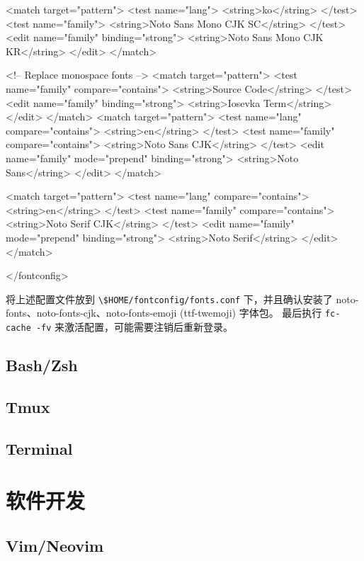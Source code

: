 \begin{lstcode}
  <match target="pattern">
    <test name="lang">
      <string>ko</string>
    </test>
    <test name="family">
      <string>Noto Sans Mono CJK SC</string>
    </test>
    <edit name="family" binding="strong">
      <string>Noto Sans Mono CJK KR</string>
    </edit>
  </match>
  
  <!-- Replace monospace fonts -->
  <match target="pattern">
    <test name="family" compare="contains">
      <string>Source Code</string>
    </test>
    <edit name="family" binding="strong">
      <string>Iosevka Term</string>
    </edit>
  </match>
    <match target="pattern">
    <test name="lang" compare="contains">
      <string>en</string>
    </test>
    <test name="family" compare="contains">
      <string>Noto Sans CJK</string>
    </test>
    <edit name="family" mode="prepend" binding="strong">
      <string>Noto Sans</string>
    </edit>
  </match>

  <match target="pattern">
    <test name="lang" compare="contains">
      <string>en</string>
    </test>
    <test name="family" compare="contains">
      <string>Noto Serif CJK</string>
    </test>
    <edit name="family" mode="prepend" binding="strong">
      <string>Noto Serif</string>
    </edit>
  </match>

</fontconfig>
\end{lstcode}

将上述配置文件放到 \lstinline{\$HOME/fontconfig/fonts.conf} 下，并且确认安装了 noto-fonts、noto-fonts-cjk、noto-fonts-emoji (ttf-twemoji) 字体包。
最后执行 \lstinline{fc-cache -fv} 来激活配置，可能需要注销后重新登录。

\subsection{Bash/Zsh}

\subsection{Tmux}

\subsection{Terminal}

\section{软件开发}
\subsection{Vim/Neovim}

